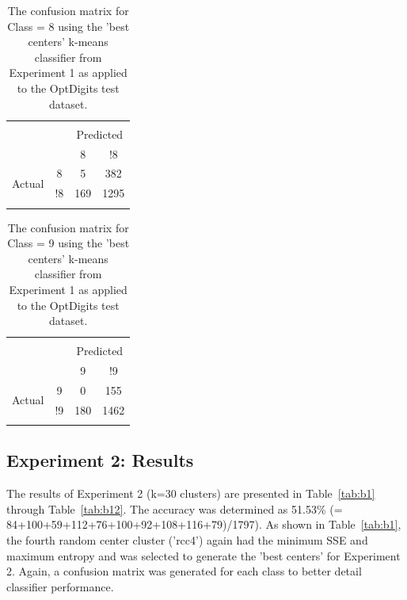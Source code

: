 \documentclass[12pt]{article}
\begin{document}
\begin{table} \centering 
  \caption{The confusion matrix for Class = 8 using the 'best centers' k-means classifier from Experiment 1 as applied to the OptDigits test dataset.} 
  \label{tab:a11} 
\begin{tabular}{lccc} 
\\[-1.8ex]\hline 
\hline \\[-1.8ex] 
\multicolumn{2}{c}{} & \multicolumn{2}{c}{Predicted} \\
\multicolumn{2}{c}{} & 8 & !8\\
\multirow{2}{*}{Actual} & 8 & 5 & 382\\
& !8 & 169 & 1295\\
\hline \\[-1.8ex]
\end{tabular} 
\end{table}


\begin{table} \centering 
  \caption{The confusion matrix for Class = 9 using the 'best centers' k-means classifier from Experiment 1 as applied to the OptDigits test dataset.} 
  \label{tab:a12} 
\begin{tabular}{lccc} 
\\[-1.8ex]\hline 
\hline \\[-1.8ex] 
\multicolumn{2}{c}{} & \multicolumn{2}{c}{Predicted} \\
\multicolumn{2}{c}{} & 9 & !9\\
\multirow{2}{*}{Actual} & 9 & 0 & 155\\
& !9 & 180 & 1462\\
\hline \\[-1.8ex]
\end{tabular} 
\end{table}

\subsection{Experiment 2: Results}
The results of Experiment 2 (k=30 clusters) are presented in Table~\ref{tab:b1} through Table~\ref{tab:b12}. The accuracy was determined as 51.53\% (= 84+100+59+112+76+100+92+108+116+79)/1797). As shown in Table~\ref{tab:b1}, the fourth random center cluster ('rcc4') again had the minimum SSE and maximum entropy and was selected to generate the 'best centers' for Experiment 2. Again, a confusion matrix was generated for each class to better detail classifier performance.
\end{document}
